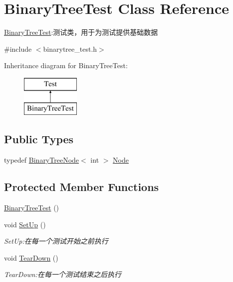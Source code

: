 \hypertarget{class_binary_tree_test}{}\section{Binary\+Tree\+Test Class Reference}
\label{class_binary_tree_test}


\hyperlink{class_binary_tree_test}{Binary\+Tree\+Test}\+:测试类，用于为测试提供基础数据  




{\ttfamily \#include $<$binarytree\+\_\+test.\+h$>$}

Inheritance diagram for Binary\+Tree\+Test\+:\begin{figure}[H]
\begin{center}
\leavevmode
\includegraphics[height=2.000000cm]{class_binary_tree_test}
\end{center}
\end{figure}
\subsection*{Public Types}
\begin{DoxyCompactItemize}
\item 
typedef \hyperlink{struct_introdunction_to_algorithm_1_1_tree_algorithm_1_1_binary_tree_node}{Binary\+Tree\+Node}$<$ int $>$ \hyperlink{class_binary_tree_test_ad4aa3d3d01bf0b1b820fffa58e81e15b}{Node}
\end{DoxyCompactItemize}
\subsection*{Protected Member Functions}
\begin{DoxyCompactItemize}
\item 
\hyperlink{class_binary_tree_test_ab650cb6b7b008479f5294b1ed65871e5}{Binary\+Tree\+Test} ()
\item 
void \hyperlink{class_binary_tree_test_ab718ba725e8099dda414f5dbc11e881b}{Set\+Up} ()
\begin{DoxyCompactList}\small\item\em Set\+Up\+:在每一个测试开始之前执行 \end{DoxyCompactList}\item 
void \hyperlink{class_binary_tree_test_ac8daf6a6b88e89733c0ade6da7d4a897}{Tear\+Down} ()
\begin{DoxyCompactList}\small\item\em Tear\+Down\+:在每一个测试结束之后执行 \end{DoxyCompactList}\end{DoxyCompactItemize}
